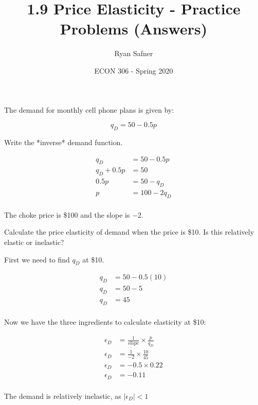 \documentclass[12 pt]{exam}
\title{1.9 Price Elasticity - Practice Problems (Answers)}
\author{Ryan Safner}
\date{ECON 306 - Spring 2020}
\begin{document}
\maketitle

The demand for monthly cell phone plans is given by:

$$q_D =  50-0.5p$$

\begin{questions}

\question  Write the *inverse* demand function.

\begin{solution}

\begin{align*}
	q_D&=50-0.5p\\
	q_D+0.5p&=50\\
	0.5p&=50-q_D\\
	p&=100-2q_D\\
\end{align*}

The choke price is \$100 and the slope is $-2$.

\end{solution}

\question Calculate the price elasticity of demand when the price is \$10. Is this relatively elastic or inelastic?

\begin{solution}

First we need to find $q_D$ at \$10. 

\begin{align*}
	q_D&=50-0.5(10)\\
	q_D&=50-5\\
	q_D&=45\\
\end{align*}

	Now we have the three ingredients to calculate elasticity at \$10:
	 
\begin{align*}
	\epsilon_D &=\frac{1}{slope} \times \frac{p}{q_D}	\\
	\epsilon_D &=\frac{1}{-2} \times \frac{10}{45}	\\
	\epsilon_D &=-0.5 \times 0.22\\
	\epsilon_D &=-0.11\\
\end{align*}

The demand is relatively inelastic, as $|\epsilon_D|<1$ 

\end{solution}


\end{questions}
\end{document}
